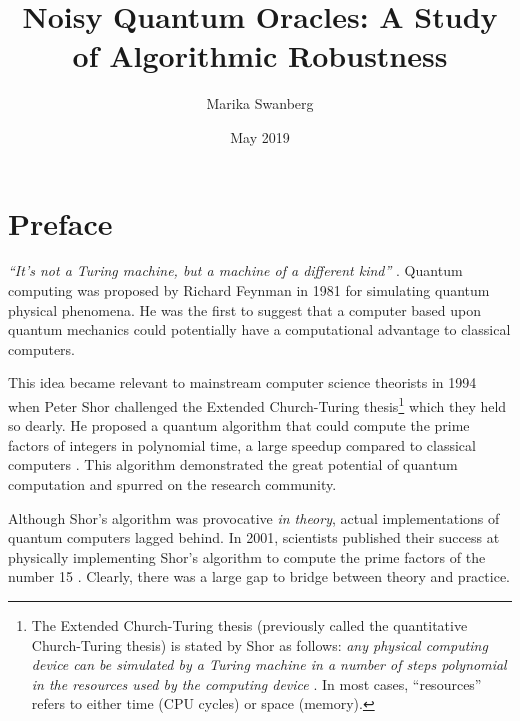 \documentclass[12pt,twoside]{reedthesis}
\title{Noisy Quantum Oracles: A Study of Algorithmic Robustness}
\author{Marika Swanberg}
\date{May 2019}
\theoremstyle{definition}
\begin{document}
  \maketitle
  \frontmatter %
  \pagestyle{empty} %


	

   \chapter*{Preface}

  
\emph{``It's not a Turing machine, but a machine of a different kind''} \citep{feynman1982simulating}. Quantum computing was proposed by Richard Feynman in 1981 for simulating quantum physical phenomena. He was the first to suggest that a computer based upon quantum mechanics could potentially have a computational advantage to classical computers. 

This idea became relevant to mainstream computer science theorists in 1994 when Peter Shor challenged the Extended Church-Turing thesis\footnote{The Extended Church-Turing thesis (previously called the quantitative Church-Turing thesis) is stated by Shor as follows: \emph{any physical computing device can be simulated by a Turing machine in a number of steps polynomial in the resources used by the computing device }\citep{shor1999polynomial}. In most cases, ``resources'' refers to either time (CPU cycles) or space (memory).} which they held so dearly. He proposed a quantum algorithm that could compute the prime factors of integers in polynomial time, a large speedup compared to classical computers \citep{shor1999polynomial}. This algorithm demonstrated the great potential of quantum computation and spurred on the research community.

Although Shor's algorithm was provocative \emph{in theory}, actual implementations of quantum computers lagged behind. In 2001, scientists published their success at physically implementing Shor's algorithm to compute the prime factors of the number 15  \citep{experimentalshor2001}. Clearly, there was a large gap to bridge between theory and practice. 
\end{document}
